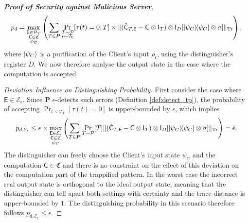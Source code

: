 \documentclass[12pt]{iopart}
\newcommand{\cptp}[1]{\mathsf{#1}} \newcommand{\pd}[1]{\mathcal{#1}}  \newcommand{\sch}[1]{\bm{#1}}
\newcommand{\Id}{\cptp{I}}
\renewcommand{\1}{\mathds{1}}
\newcommand{\Cdev}[1]{\tilde{\cptp C}_{T, #1}}
\begin{document}
\begin{proof}[\bf Proof of Security against Malicious Server]
\begin{align}
p_d = \max_{\substack{\cptp E \in \mathcal P_V\\ \cptp C \in \mathfrak{C} \\ \psi_C}}\left(\sum_{T\in \sch P} \Pr_{\substack{T \sim \pd P \\ t\sim \pd T_{\cptp E}}}[\tau(t) = 0, T] \times \|(\Cdev{\cptp E}  - \cptp C\otimes \Id_T)\otimes\Id_D [\dyad{\psi_C} \otimes \sigma]\|_{\Tr}\right),
\end{align}
where $\ket{\psi_C}$ is a purification of the Client's input $\rho_C$ using the distinguisher's register $D$. We now therefore analyse the output state in the case where the computation is accepted.

\textit{Deviation Influence on Distinguishing Probability.}
First consider the case where $\cptp E \in \mathcal E_\epsilon$. 
Since $\sch P$ $\epsilon$-detects such errors (Definition \ref{def:detect_tp}), the probability of accepting $\Pr_{t\sim \pd T_{\cptp E}}[\tau(t) = 0]$ is upper-bounded by $\epsilon$, which implies
\begin{align}
p_{d, \mathcal E_\epsilon} \leq \epsilon \times \max_{\substack{\cptp E \in \mathcal E_\epsilon\\ \cptp C \in \mathfrak{C} \\ \psi_C}}\left(\sum_{T\in \sch P} \Pr_{T \sim \pd P}[T]\|(\Cdev{\cptp E}  - \cptp C\otimes \Id_T)\otimes\Id_D [\dyad{\psi_C} \otimes \sigma]\|_{\Tr}\right) = \hat{\epsilon}.
\end{align}
The distinguisher can freely choose the Client's input state $\psi_C$ and the computation $\cptp C \in \mathfrak{C}$ and there is no constraint on the effect of this deviation on the computation part of the trappified pattern. In the worst case the incorrect real output state is orthogonal to the ideal output state, meaning that the distinguisher can tell apart both settings with certainty and the trace distance is upper-bounded by $1$. The distinguishing probability in this scenario therefore follows $p_{d, \mathcal E_\epsilon} \leq \epsilon$.


\end{proof}
\end{document}
